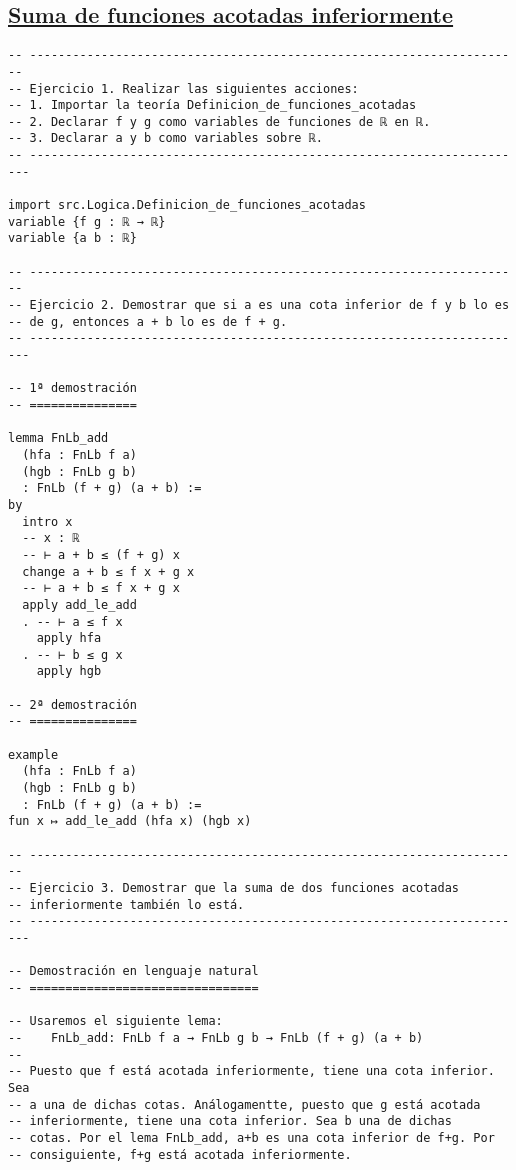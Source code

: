 \subsection{\href{./src/Logica/Suma\_de\_funciones\_acotadas\_inferiormente.lean}{Suma de funciones acotadas inferiormente}}
\label{sec:org895ae37}
\begin{verbatim}
-- ---------------------------------------------------------------------
-- Ejercicio 1. Realizar las siguientes acciones:
-- 1. Importar la teoría Definicion_de_funciones_acotadas
-- 2. Declarar f y g como variables de funciones de ℝ en ℝ.
-- 3. Declarar a y b como variables sobre ℝ.
-- ----------------------------------------------------------------------

import src.Logica.Definicion_de_funciones_acotadas
variable {f g : ℝ → ℝ}
variable {a b : ℝ}

-- ---------------------------------------------------------------------
-- Ejercicio 2. Demostrar que si a es una cota inferior de f y b lo es
-- de g, entonces a + b lo es de f + g.
-- ----------------------------------------------------------------------

-- 1ª demostración
-- ===============

lemma FnLb_add
  (hfa : FnLb f a)
  (hgb : FnLb g b)
  : FnLb (f + g) (a + b) :=
by
  intro x
  -- x : ℝ
  -- ⊢ a + b ≤ (f + g) x
  change a + b ≤ f x + g x
  -- ⊢ a + b ≤ f x + g x
  apply add_le_add
  . -- ⊢ a ≤ f x
    apply hfa
  . -- ⊢ b ≤ g x
    apply hgb

-- 2ª demostración
-- ===============

example
  (hfa : FnLb f a)
  (hgb : FnLb g b)
  : FnLb (f + g) (a + b) :=
fun x ↦ add_le_add (hfa x) (hgb x)

-- ---------------------------------------------------------------------
-- Ejercicio 3. Demostrar que la suma de dos funciones acotadas
-- inferiormente también lo está.
-- ----------------------------------------------------------------------

-- Demostración en lenguaje natural
-- ================================

-- Usaremos el siguiente lema:
--    FnLb_add: FnLb f a → FnLb g b → FnLb (f + g) (a + b)
--
-- Puesto que f está acotada inferiormente, tiene una cota inferior. Sea
-- a una de dichas cotas. Análogamentte, puesto que g está acotada
-- inferiormente, tiene una cota inferior. Sea b una de dichas
-- cotas. Por el lema FnLb_add, a+b es una cota inferior de f+g. Por
-- consiguiente, f+g está acotada inferiormente.


\end{verbatim}
